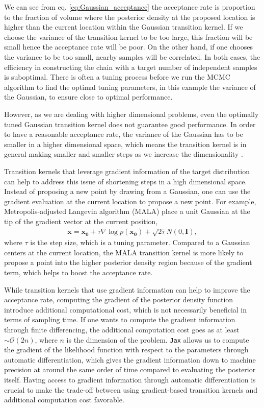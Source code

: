 \documentclass[twocolumn]{aastex631}
\begin{document}
We can see from eq. \ref{eq:Gaussian_acceptance} the acceptance rate is
proportion to the fraction of volume where the posterior density at the proposed
location is higher than the current location within the Gaussian transition
kernel. If we choose the variance of the transition kernel to be too large, this
fraction will be small hence the acceptance rate will be poor. On the other
hand, if one chooses the variance to be too small, nearby samples will be
correlated. In both cases, the efficiency in constructing the chain with a
target number of independent samples is suboptimal. There is often a tuning
process before we run the MCMC algorithm to find the optimal tuning parameters,
in this example the variance of the Gaussian, to ensure close to optimal
performance.

However, as we are dealing with higher dimensional problems, even the optimally
tuned Gaussian transition kernel does not guarantee good performance. In order
to have a reasonable acceptance rate, the variance of the Gaussian has to be
smaller in a higher dimensional space, which means the transition kernel is in
general making smaller and smaller steps as we increase the dimensionality
\cite{2017arXiv170102434B}.

Transition kernels that leverage gradient information of the target
distribution can help to address this issue of shortening steps in a high
dimensional space. Instead of proposing a new point by drawing from a Gaussian,
one can use the gradient evaluation at the current location to propose a new
point. For example, Metropolis-adjusted Langevin algorithm (MALA) \cite{10.2307/2346184}
place a unit Gaussian at the tip of the gradient vector at the current position,
\begin{align}
    \mathbf{x} = \mathbf{x_0} + \tau \nabla\log{p(\mathbf{x_0})} + \sqrt{2\tau}N(0,\mathbf{I}),
\end{align}
where $\tau$ is the step size, which is a tuning parameter. Compared to a
Gaussian centers at the current location, the MALA transition kernel is more
likely to propose a point into the higher posterior density region because of
the gradient term, which helps to boost the acceptance rate.

While transition kernels that use gradient information can help to improve the
acceptance rate, computing the gradient of the posterior density function
introduce additional computational cost, which is not necessarily beneficial in
terms of sampling time. If one wants to compute the gradient information through
finite differencing, the additional computation cost goes as at least $\sim
\mathcal{O}(2n)$, where $n$ is the dimension of the problem. \texttt{Jax} allows
us to compute the gradient of the likelihood function with respect to the
parameters through automatic differentiation, which gives the gradient
information down to machine precision at around the same order of time compared
to evaluating the posterior itself. Having access to gradient information
through automatic differentiation is crucial to make the trade-off between using
gradient-based transition kernels and additional computation cost favorable.
\end{document}
